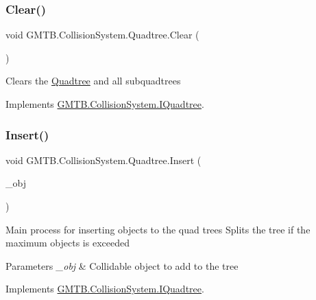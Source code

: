 \subsubsection{\texorpdfstring{Clear()}{Clear()}}
{\footnotesize\ttfamily void G\+M\+T\+B.\+Collision\+System.\+Quadtree.\+Clear (\begin{DoxyParamCaption}{ }\end{DoxyParamCaption})}



Clears the \mbox{\hyperlink{class_g_m_t_b_1_1_collision_system_1_1_quadtree}{Quadtree}} and all subquadtrees 



Implements \mbox{\hyperlink{interface_g_m_t_b_1_1_collision_system_1_1_i_quadtree_a1c8e400a9e317fe0152b81e567823443}{G\+M\+T\+B.\+Collision\+System.\+I\+Quadtree}}.

\mbox{\label{class_g_m_t_b_1_1_collision_system_1_1_quadtree_a31faf1269f7048a71c59db80f8e6c375}} 
\subsubsection{\texorpdfstring{Insert()}{Insert()}}
{\footnotesize\ttfamily void G\+M\+T\+B.\+Collision\+System.\+Quadtree.\+Insert (\begin{DoxyParamCaption}\item[{\mbox{\hyperlink{interface_g_m_t_b_1_1_collision_system_1_1_i_collidable}{I\+Collidable}}}]{\+\_\+obj }\end{DoxyParamCaption})}



Main process for inserting objects to the quad trees Splits the tree if the maximum objects is exceeded 


\begin{DoxyParams}{Parameters}
{\em \+\_\+obj} & Collidable object to add to the tree \\
\hline
\end{DoxyParams}


Implements \mbox{\hyperlink{interface_g_m_t_b_1_1_collision_system_1_1_i_quadtree_a22a84d4c7495fdb318cdd1d359c3591b}{G\+M\+T\+B.\+Collision\+System.\+I\+Quadtree}}.

\mbox{\label{class_g_m_t_b_1_1_collision_system_1_1_quadtree_aefeacbfba0320ea7e23c15658179c2c6}} 
